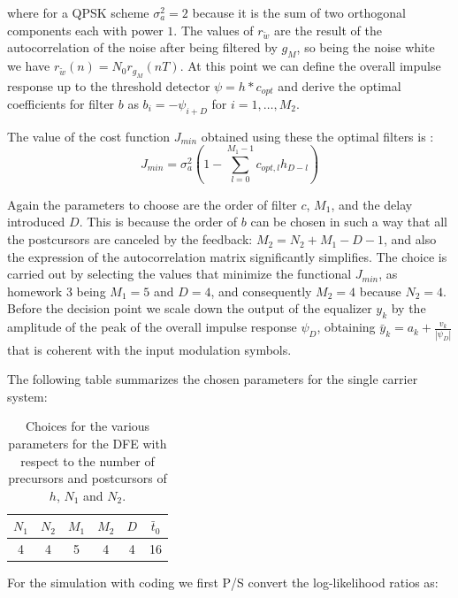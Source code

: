 \documentclass[a4paper,11.5pt]{article}
\begin{document}
where for a QPSK scheme $\sigma_a^2=2$ because it is the sum of two orthogonal components each with power $1$. The values of $r_{\tilde{w}}$ are the result of the autocorrelation of the noise after being filtered by $g_M$, so being the noise white we have $r_{\tilde{w}}(n)=N_0r_{g_M}(nT)$. At this point we can define the overall impulse response up to the threshold detector $\psi = h*c_{opt}$ and derive the optimal coefficients for filter $b$ as $b_i=-\psi_{i+D}$ for $i=1,\dots,M_2$.

The value of the cost function $J_{min}$ obtained using these the optimal filters is :
\begin{equation} \label{eq:jmin}
J_{min} = \sigma^2_a \left( 1-\sum_{l=0}^{M_1-1} c_{opt,l}h_{D-l}\right)
\end{equation}

Again the parameters to choose are the order of filter $c$, $M_1$, and the delay introduced $D$. This is because the order of $b$ can be chosen in such a way that all the postcursors are canceled by the feedback: $M_2=N_2+M_1-D-1$, and also the expression of the autocorrelation matrix significantly simplifies. The choice is carried out by selecting the values that minimize the functional $J_{min}$, as homework 3 being $M_1=5$ and $D=4$, and consequently $M_2=4$ because $N_2=4$. Before the decision point we scale down the output of the equalizer $y_k$ by the amplitude of the peak of the overall impulse response $\psi_D$, obtaining $\bar{y}_k = a_k + \frac{v_k}{|\psi_D|}$ that is coherent with the input modulation symbols.

The following table summarizes the chosen parameters for the single carrier system:

\begin{table}[htbp]
	\begin{center}
		\begin{tabular}{cccccc}
			\toprule
			$N_1$ & $N_2$ & $M_1$ & $M_2$ & $D$ & $\bar{t}_0$ \\
			\midrule
			 4  &  4  & 5 & 4  & 4 & 16 \\
			\bottomrule
		\end{tabular}
	\end{center}
	\label{tab:sumup}
	\caption{Choices for the various parameters for the DFE with respect to the number of precursors and postcursors of $h$, $N_1$ and $N_2$.}
\end{table} 

For the simulation with coding we first P/S convert the log-likelihood ratios as:
\end{document}

